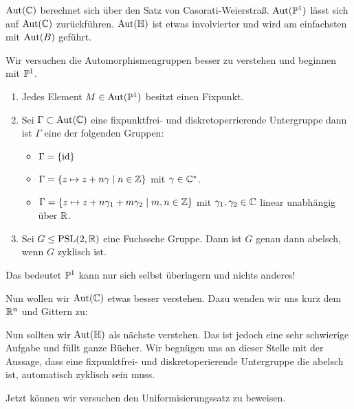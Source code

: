 $\Aut(\C)$ berechnet sich über den Satz von
Casorati-Weierstraß. $\Aut(\P^1)$ lässt sich auf $\Aut(\C)$
zurückführen. $\Aut(\h)$ ist etwas involvierter und wird am
einfachsten mit $\Aut(B)$ geführt.

Wir versuchen die Automorphismengruppen besser zu verstehen und
beginnen mit $\P^1$.

\begin{lemma}
  \begin{enumerate}
  \item   Jedes Element $M \in \Aut(\P^1)$ besitzt einen Fixpunkt.
  \item   Sei $\Gamma \subset \Aut(\C)$ eine fixpunktfrei- und
    diskretoperrierende Untergruppe dann ist $\Gamma$ eine der folgenden
    Gruppen:
    \begin{itemize}
    \item $\Gamma = \{\id\}$
    \item $\Gamma = \{z \mapsto z + n\gamma \mid n \in \Z\}$ mit $\gamma \in \C^\ast$.
    \item $\Gamma = \{z \mapsto z + n\gamma_1 + m \gamma_2 \mid m,n \in
      \Z\}$ mit $\gamma_1, \gamma_2 \in \C$ linear unabhängig über $\R$.
    \end{itemize} 
  \item Sei $G \leq \PSL(2, \R)$ eine Fuchssche Gruppe. Dann ist $G$ genau
    dann abelsch, wenn $G$ zyklisch ist.
  \end{enumerate}
\end{lemma}


Das bedeutet $\P^1$ kann nur sich selbst überlagern und nichts
anderes!

Nun wollen wir $\Aut(\C)$ etwas besser verstehen. Dazu wenden wir uns
kurz dem $\R^n$ und Gittern zu:

Nun sollten wir $\Aut(\h)$ als nächste verstehen. Das ist jedoch eine
sehr schwierige Aufgabe und füllt ganze Bücher. Wir begnügen uns an
dieser Stelle mit der Aussage, dass eine fixpunktfrei- und
diskretoperierende Untergruppe die abelsch ist, automatisch zyklisch
sein muss.

Jetzt können wir versuchen den Uniformisierungssatz zu beweisen.

